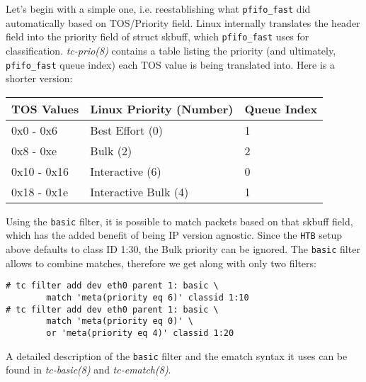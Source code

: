 \documentclass[12pt,twoside]{article}
\newcommand{\man}{\textit}
\newcommand{\qdisc}{\texttt}
\newcommand{\filter}{\texttt}
\begin{document}
Let's begin with a simple one, i.e. reestablishing what \qdisc{pfifo\_fast} did
automatically based on TOS/Priority field. Linux internally translates the
header field into the priority field of struct skbuff, which
\qdisc{pfifo\_fast} uses for
classification. \man{tc-prio(8)} contains a table listing the priority (and
ultimately, \qdisc{pfifo\_fast} queue index) each TOS value is being translated into.
Here is a shorter version:
\begin{center}
\begin{tabular}{lll}
TOS Values & Linux Priority (Number) & Queue Index \\
\midrule
0x0  - 0x6  & Best Effort (0)      & 1 \\
0x8  - 0xe  & Bulk (2)             & 2 \\
0x10 - 0x16 & Interactive (6)      & 0 \\
0x18 - 0x1e & Interactive Bulk (4) & 1 \\
\end{tabular}
\end{center}
Using the \filter{basic} filter, it is possible to match packets based on that skbuff
field, which has the added benefit of being IP version agnostic. Since the
\qdisc{HTB} setup above defaults to class ID 1:30, the Bulk priority can be
ignored. The \filter{basic} filter allows to combine matches, therefore we get along
with only two filters:
\begin{Verbatim}
# tc filter add dev eth0 parent 1: basic \
        match 'meta(priority eq 6)' classid 1:10
# tc filter add dev eth0 parent 1: basic \
        match 'meta(priority eq 0)' \
        or 'meta(priority eq 4)' classid 1:20
\end{Verbatim}
A detailed description of the \filter{basic} filter and the ematch syntax it uses can be
found in \man{tc-basic(8)} and \man{tc-ematch(8)}.
\end{document}
